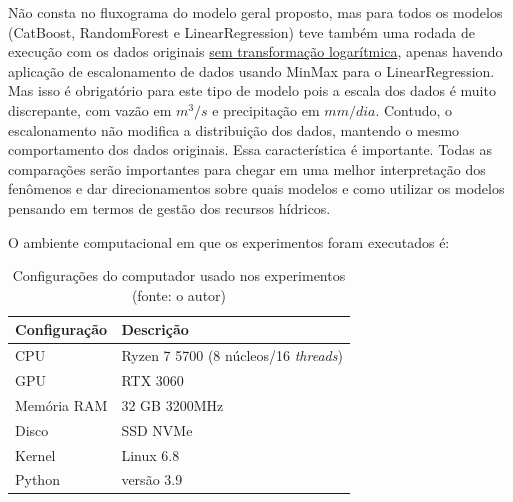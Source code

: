 Não consta no fluxograma do modelo geral proposto, mas para todos os modelos (CatBoost, RandomForest e LinearRegression) teve também uma rodada de execução com os dados originais \underline{sem transformação logarítmica}, apenas havendo aplicação de escalonamento de dados usando MinMax para o LinearRegression. Mas isso é obrigatório para este tipo de modelo pois a escala dos dados é muito discrepante, com vazão em $m^3/s$ e precipitação em $mm/dia$. Contudo, o escalonamento não modifica a distribuição dos dados, mantendo o mesmo comportamento dos dados originais. Essa característica é importante. Todas as comparações serão importantes para chegar em uma melhor interpretação dos fenômenos e dar direcionamentos sobre quais modelos e como utilizar os modelos pensando em termos de gestão dos recursos hídricos.



O ambiente computacional em que os experimentos foram executados é:

\begin{table}[!h]
	\centering \small
	\caption{Configurações do computador usado nos experimentos\\(fonte: o autor)}
	\begin{tabular}{|l|l|} \hline 
		\textbf{Configuração} & \textbf{Descrição} \\\hline
		CPU                   & Ryzen 7 5700 (8 núcleos/16 \textit{threads}) \\\hline
		GPU                   & RTX 3060                                     \\\hline
		Memória RAM           & 32 GB 3200MHz                                \\\hline
		Disco                 & SSD NVMe                                     \\\hline
		Kernel                & Linux 6.8                                    \\\hline
		Python                & versão 3.9                                   \\\hline
	\end{tabular}
	\label{tab:config_pc}
\end{table}

